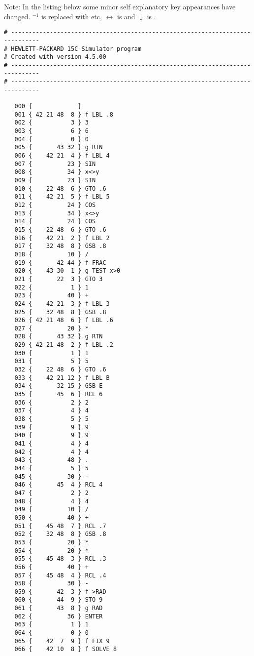 \documentclass[english,a4paper,onepage, 10pt]{scrbook}
\begin{document}
Note: In the listing below some minor self explanatory key appearances have changed.  $^{-1}$ is replaced with  etc, $\leftrightarrow$ is  and $\downarrow$ is .
\begin{multicols}{2}
\begin{lstlisting}  
# ------------------------------------------------------------------------------
# HEWLETT-PACKARD 15C Simulator program
# Created with version 4.5.00
# ------------------------------------------------------------------------------
# ------------------------------------------------------------------------------

   000 {             } 
   001 { 42 21 48  8 } f LBL .8
   002 {           3 } 3
   003 {           6 } 6
   004 {           0 } 0
   005 {       43 32 } g RTN
   006 {    42 21  4 } f LBL 4
   007 {          23 } SIN
   008 {          34 } x<>y
   009 {          23 } SIN
   010 {    22 48  6 } GTO .6
   011 {    42 21  5 } f LBL 5
   012 {          24 } COS
   013 {          34 } x<>y
   014 {          24 } COS
   015 {    22 48  6 } GTO .6
   016 {    42 21  2 } f LBL 2
   017 {    32 48  8 } GSB .8
   018 {          10 } /
   019 {       42 44 } f FRAC
   020 {    43 30  1 } g TEST x>0
   021 {       22  3 } GTO 3
   022 {           1 } 1
   023 {          40 } +
   024 {    42 21  3 } f LBL 3
   025 {    32 48  8 } GSB .8
   026 { 42 21 48  6 } f LBL .6
   027 {          20 } *
   028 {       43 32 } g RTN
   029 { 42 21 48  2 } f LBL .2
   030 {           1 } 1
   031 {           5 } 5
   032 {    22 48  6 } GTO .6
   033 {    42 21 12 } f LBL B
   034 {       32 15 } GSB E
   035 {       45  6 } RCL 6
   036 {           2 } 2
   037 {           4 } 4
   038 {           5 } 5
   039 {           9 } 9
   040 {           9 } 9
   041 {           4 } 4
   042 {           4 } 4
   043 {          48 } .
   044 {           5 } 5
   045 {          30 } -
   046 {       45  4 } RCL 4
   047 {           2 } 2
   048 {           4 } 4
   049 {          10 } /
   050 {          40 } +
   051 {    45 48  7 } RCL .7
   052 {    32 48  8 } GSB .8
   053 {          20 } *
   054 {          20 } *
   055 {    45 48  3 } RCL .3
   056 {          40 } +
   057 {    45 48  4 } RCL .4
   058 {          30 } -
   059 {       42  3 } f->RAD
   060 {       44  9 } STO 9
   061 {       43  8 } g RAD
   062 {          36 } ENTER
   063 {           1 } 1
   064 {           0 } 0
   065 {    42  7  9 } f FIX 9
   066 {    42 10  8 } f SOLVE 8

\end{lstlisting}
\end{multicols}
\end{document}
